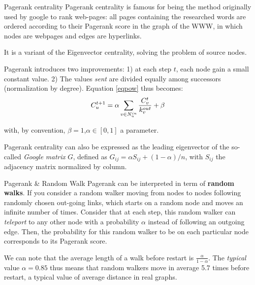\documentclass[a4paper,11pt]{book}
\begin{document}
\begin{textbox}{Pagerank centrality}
Pagerank centrality is famous for being the method originally used by google to rank web-pages: all pages containing the researched words are ordered according to their Pagerank score in the graph of the WWW, in which nodes are webpages and edges are hyperlinks. 

It is a variant of the Eigenvector centrality, solving the problem of source nodes. 

Pagerank introduces two improvements: 1) at each step $t$, each node gain a small constant value. 2) The values \textit{sent} are divided equally among successors (normalization by degree). Equation \ref{eqpow} thus becomes:
\begin{equation}
    \centering
C^{t+1}_u = \alpha \sum_{v\in N^{in}_u} \frac{C^t_v}{k^{out}_v} + \beta
\end{equation}

with, by convention, $\beta=1$,$\alpha \in [0,1]$ a parameter.

Pagerank centrality can also be expressed as the leading eigenvector of the so-called \textit{Google matrix} $G$, defined as $G_{ij} = \alpha S_{ij} + (1- \alpha)/n$, with $S_{ij}$ the adjacency matrix normalized by column.

\end{textbox}





\begin{textbox}{Pagerank \& Random Walk}
Pagerank can be interpreted in term of \textbf{random walks}. If you consider a random walker moving from nodes to nodes following randomly chosen out-going links, which starts on a random node and moves an infinite number of times. Consider that at each step, this random walker can \textit{teleport} to any other node with a probability $\alpha$ instead of following an outgoing edge. Then, the probability for this random walker to be on each particular node corresponds to its Pagerank score. 

We can note that the average length of a walk before restart is $\frac{\alpha}{1-\alpha}$. The \textit{typical} value $\alpha=0.85$ thus means that random walkers move in average 5.7 times before restart, a typical value of average distance in real graphs.
\end{textbox}
\end{document}
